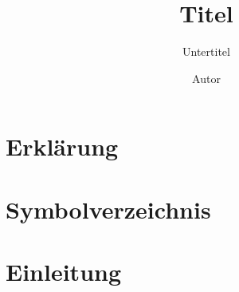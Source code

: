 \documentclass[%
	BCOR12mm, %
	tablecaptionabove %
	]{scrbook}
\begin{document}
\titlehead{\Large Karlsruher Institut für Technologie (KIT) \hfill Institut} %
\subject{Abschlussarbeit} %
\title{Titel}
\subtitle{Untertitel}
\author{Autor} %
\publishers{} %
\maketitle
\frontmatter
\chapter{Erklärung} %
\label{cha:erklaerung}

\tableofcontents
\chapter{Symbolverzeichnis} %
\label{cha:symbolverzeichnis}


\mainmatter
\chapter{Einleitung} %
\label{cha:einleitung}

\end{document}
